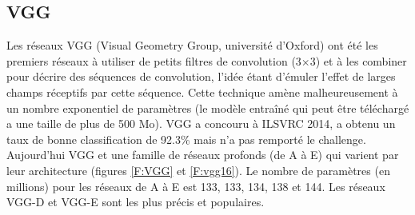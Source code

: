 \documentclass{DocBleu}
\begin{document}
\subsection{VGG}
Les réseaux VGG (Visual Geometry Group, université d'Oxford) \cite{Simonyan14} ont été les premiers réseaux à utiliser de petits filtres de convolution (3$\times$3) et à les combiner pour décrire des séquences de convolution, l'idée étant d'émuler l'effet de larges champs réceptifs par cette séquence. Cette technique amène malheureusement à un nombre exponentiel de paramètres (le modèle entraîné qui peut être téléchargé a une taille de plus de 500 Mo).
VGG a concouru à ILSVRC 2014, a obtenu un taux de bonne classification de 92.3\% mais n'a pas remporté le challenge.
Aujourd'hui VGG et une famille de réseaux profonds (de A à E)  qui varient par leur architecture (figures \ref{F:VGG} et \ref{F:vgg16}). Le nombre de paramètres (en millions) pour les réseaux de A à E est 133, 133, 134, 138 et 144. Les réseaux VGG-D et VGG-E sont les plus précis et populaires.
\end{document}
